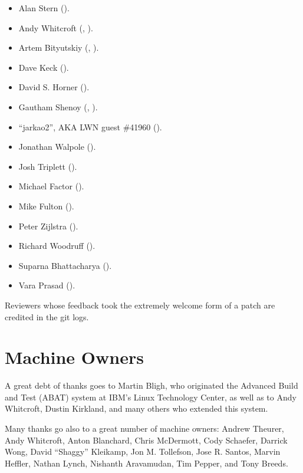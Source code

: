 \begin{itemize}
\item	Alan Stern ().
\item	Andy Whitcroft (,
	).
\item	Artem Bityutskiy (,
	).
\item	Dave Keck ().
\item	David S. Horner
	().
\item	Gautham Shenoy (,
	).
\item	``jarkao2'', AKA LWN guest \#41960 ().
\item	Jonathan Walpole ().
\item	Josh Triplett ().
\item	Michael Factor ().
\item	Mike Fulton ().
\item	Peter Zijlstra
	(). %
\item	Richard Woodruff ().
\item	Suparna Bhattacharya ().
\item	Vara Prasad
	().
\end{itemize}

Reviewers whose feedback took the extremely welcome form of a patch
are credited in the git logs.

\section{Machine Owners}

A great debt of thanks goes to Martin Bligh, who originated the
Advanced Build and Test (ABAT) system at IBM's Linux Technology
Center, as well as to Andy Whitcroft, Dustin Kirkland, and many
others who extended this system.

Many thanks go also to a great number of machine owners:
Andrew Theurer,
Andy Whitcroft,
Anton Blanchard,
Chris McDermott,
Cody Schaefer,
Darrick Wong,
David ``Shaggy'' Kleikamp,
Jon M. Tollefson,
Jose R. Santos,
Marvin Heffler,
Nathan Lynch,
Nishanth Aravamudan,
Tim Pepper,
and
Tony Breeds.

